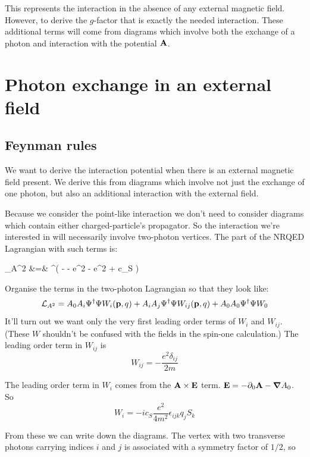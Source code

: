 This represents the interaction in the absence of any external magnetic field.  However, to derive the $g$-factor that is exactly the needed interaction.  These additional terms will come from diagrams which involve both the exchange of a photon and interaction with the potential $\mathbf{A}$.

\section{Photon exchange in an external field}

\subsection{Feynman rules}



We want to derive the interaction potential when there is an external magnetic field present.  We derive this from diagrams which involve not just the exchange of one photon, but also an additional interaction with the external field.

Because we consider the point-like interaction we don't need to consider diagrams which contain either charged-particle's propagator.  So the interaction we're interested in will necessarily involve two-photon vertices.  The part of the NRQED Lagrangian with such terms is:

\scriptsize
\beqa
	_{A^2} &=& \Psi^\dagger ( -   - e^2  - e^2
		+ c_S  ) \Psi
\eeqa
\normalsize


Organise the terms in the two-photon Lagrangian so that they look like:
\[
	\mathcal{L}_{A^2} = A_0 A_i \Psi^\dagger \Psi W_{i}(\mathbf{p}, q) + A_i A_j \Psi^\dagger \Psi W_{ij}(\mathbf{p}, q) + A_0 A_0 \Psi^\dagger \Psi W_0 
\]
It'll turn out we want only the very first leading order terms of $W_i$ and $W_{ij}$.  (These $W$ shouldn't be confused with the fields in the spin-one calculation.)  The leading order term in $W_{ij}$ is
\[
	W_{ij} = - \frac{e^2 \delta_{ij}}{2m}
\]	

The leading order term in $W_i$ comes from the $\mathbf{A} \times \mathbf{E}$ term.  $\mathbf{E} = -\partial_0 \mathbf{A} - \mbox{\boldmath$ \nabla $} A_0$.  So
\[
	W_i = - i c_S \frac{e^2}{4m^2} \epsilon_{ijk} {q_j S_k} 
\]


From these we can write down the diagrams.  The vertex with two transverse photons carrying indices $i$ and $j$ is associated with a symmetry factor of $1/2$, so

